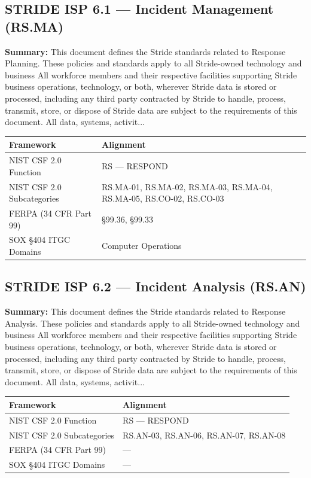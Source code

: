 \documentclass[11pt,landscape]{article}
\begin{document}
\subsection{\textcolor{strideblue}{STRIDE ISP 6.1} --- Incident Management (RS.MA)}
\label{pol:ISP61}

\textbf{Summary:} This document defines the Stride standards related to Response Planning. These policies and standards apply to all Stride-owned technology and business All workforce members and their respective facilities supporting Stride business operations, technology, or both, wherever Stride data is stored or processed, including any third party contracted by Stride to handle, process, transmit, store, or dispose of Stride data are subject to the requirements of this document. All data, systems, activit...

\begin{tabularx}{\textwidth}{|p{4cm}|X|}
\hline
\rowcolor{headgray} \textbf{Framework} & \textbf{Alignment} \\
\hline
NIST CSF 2.0 Function & RS --- RESPOND \\
\hline
NIST CSF 2.0 Subcategories & RS.MA-01, RS.MA-02, RS.MA-03, RS.MA-04, RS.MA-05, RS.CO-02, RS.CO-03 \\
\hline
FERPA (34 CFR Part 99) & §99.36, §99.33 \\
\hline
SOX §404 ITGC Domains & Computer Operations \\
\hline
\end{tabularx}


\subsection{\textcolor{strideblue}{STRIDE ISP 6.2} --- Incident Analysis (RS.AN)}
\label{pol:ISP62}

\textbf{Summary:} This document defines the Stride standards related to Response Analysis. These policies and standards apply to all Stride-owned technology and business All workforce members and their respective facilities supporting Stride business operations, technology, or both, wherever Stride data is stored or processed, including any third party contracted by Stride to handle, process, transmit, store, or dispose of Stride data are subject to the requirements of this document. All data, systems, activit...

\begin{tabularx}{\textwidth}{|p{4cm}|X|}
\hline
\rowcolor{headgray} \textbf{Framework} & \textbf{Alignment} \\
\hline
NIST CSF 2.0 Function & RS --- RESPOND \\
\hline
NIST CSF 2.0 Subcategories & RS.AN-03, RS.AN-06, RS.AN-07, RS.AN-08 \\
\hline
FERPA (34 CFR Part 99) & --- \\
\hline
SOX §404 ITGC Domains & --- \\
\hline
\end{tabularx}
\end{document}
